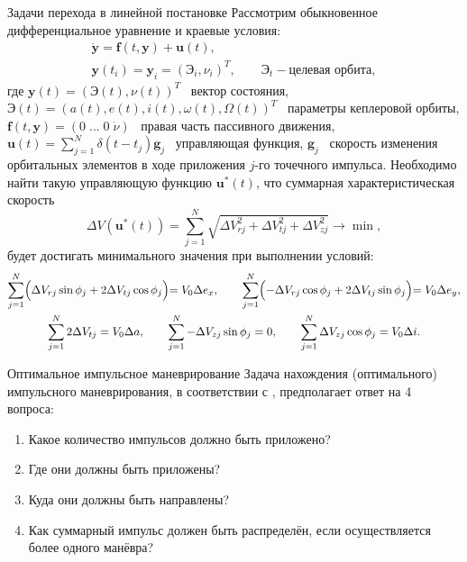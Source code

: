 \documentclass[9pt]{beamer}
\begin{document}
\begin{frame}{Задачи перехода в линейной постановке}
Рассмотрим обыкновенное дифференциальное уравнение и краевые условия:
\begin{gather*}
    \dot{\mathbf{y}} = \mathbf{f}(t, \mathbf{y}) + \mathbf{u}(t), \\
    \mathbf{y}(t_i) = \mathbf{y}_i = \left( \textbf{Э}_i, \nu_i \right)^T, \quad \quad
    \textbf{Э}_t - \text{целевая орбита},
\end{gather*}
где $\mathbf{y}(t) = \left( \textbf{Э}(t), \nu(t) \right)^T$ \textemdash\ вектор состояния, $\textbf{Э}(t)=\left( a(t), e(t), i(t), \omega(t), \Omega(t) \right)^T$ \textemdash\ параметры кеплеровой орбиты, $\mathbf{f}(t, \mathbf{y}) = (0 \; ... \; 0 \; \dot{\nu} )$ \textemdash\ правая часть пассивного движения, $\mathbf{u}(t) = \sum_{j=1}^N \delta(t - t_j) \mathbf{g}_j$ \textemdash\ управляющая функция, $\mathbf{g}_j$ \textemdash\ скорость изменения орбитальных элементов в ходе приложения $j$-го точечного импульса. Необходимо найти такую управляющую функцию $\mathbf{u}^*(t)$, что суммарная характеристическая скорость 
\begin{equation*}
    \Delta V (\mathbf{u}^*(t)) = \sum_{j=1}^N \sqrt{\Delta V_{rj}^2 + \Delta V_{tj}^2 + \Delta V_{zj}^2} \to \min,
\end{equation*}
будет достигать минимального значения при выполнении условий:
\begin{gather*}
        \sum_{j=1}^{N} \Bigl( \Delta V_{rj} \sin \phi_j + 2 \Delta V_{tj} \cos \phi_j \Bigl) = V_0 \Delta e_x, \quad \quad
        \sum_{j=1}^{N} \Bigl( -\Delta V_{rj} \cos \phi_j + 2 \Delta V_{tj} \sin \phi_j \Bigl) = V_0 \Delta e_y, \\
        \sum_{j=1}^{N} 2 \Delta V_{tj} = V_0 \Delta a, \quad \quad
        \sum_{j=1}^{N} -\Delta V_{zj} \sin \phi_j = 0, \quad \quad
        \sum_{j=1}^{N} \Delta V_{zj} \cos \phi_j = V_0 \Delta i.
    \end{gather*}
\end{frame}

\begin{frame}{Оптимальное импульсное маневрирование}
Задача нахождения (оптимального) импульсного маневрирования, в соответствии с \cite{Edelbaum_1}, предполагает ответ на 4 вопроса:
\begin{enumerate}
    \item Какое количество импульсов должно быть приложено?
    \item Где они должны быть приложены?
    \item Куда они должны быть направлены?
    \item Как суммарный импульс должен быть распределён, если осуществляется более одного манёвра?
\end{enumerate}
\end{frame}
\end{document}
